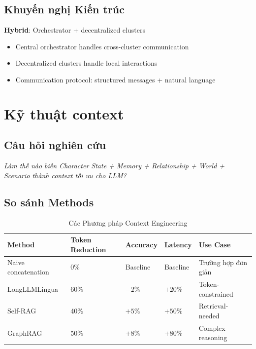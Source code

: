 \documentclass[10pt,leqno]{amsart}
\begin{document}
\subsection{Khuyến nghị Kiến trúc}

\textbf{Hybrid}: Orchestrator + decentralized clusters
\begin{itemize}
    \item Central orchestrator handles cross-cluster communication
    \item Decentralized clusters handle local interactions
    \item Communication protocol: structured messages + natural language
\end{itemize}


\section{Kỹ thuật context}

\subsection{Câu hỏi nghiên cứu}

\textit{Làm thế nào biến Character State + Memory + Relationship + World + Scenario thành context tối ưu cho LLM?}

\subsection{So sánh Methods}

\begin{table}[H]
\centering
\caption{Các Phương pháp Context Engineering}
\label{tab:context-methods}
\begin{tabular}{lllll}
\toprule
\textbf{Method} & \textbf{Token Reduction} & \textbf{Accuracy} & \textbf{Latency} & \textbf{Use Case} \\
\midrule
Naive concatenation & 0\% & Baseline & Baseline & Trường hợp đơn giản \\
LongLLMLingua & 60\% & $-2\%$ & $+20\%$ & Token-constrained \\
Self-RAG & 40\% & $+5\%$ & $+50\%$ & Retrieval-needed \\
GraphRAG & 50\% & $+8\%$ & $+80\%$ & Complex reasoning \\
\bottomrule
\end{tabular}
\end{table}
\end{document}
